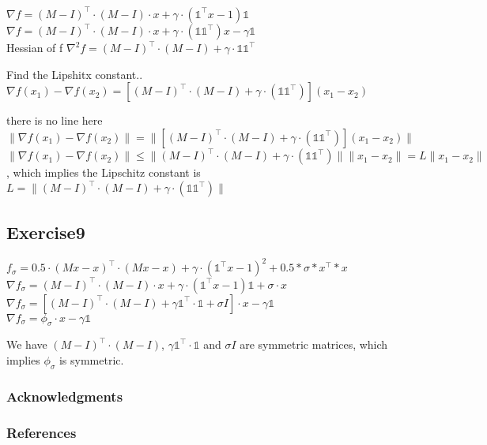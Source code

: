 \documentclass{article} %
\begin{document}
$\nabla f = (M-I)^\top\cdot(M-I)\cdot x + \gamma\cdot (\mathds{1}^\top x - 1)\mathds{1} $
\\


$\nabla f = (M-I)^\top\cdot(M-I)\cdot x + \gamma\cdot (\mathds{1} \mathds{1} ^\top)x -\gamma \mathds{1} $
\\
Hessian of f
$\nabla^2 f = (M-I)^\top\cdot(M-I) + \gamma\cdot \mathds{1}\mathds{1} ^\top$



Find the Lipshitx constant..
$\nabla f(x_1) - \nabla f(x_2) =  [ (M-I)^\top\cdot(M-I) + \gamma\cdot (\mathds{1} \mathds{1} ^\top)](x_1 - x_2)$

there is no line here\\
$\| \nabla f(x_1) - \nabla f(x_2) \|=  \| [ (M-I)^\top\cdot(M-I) + \gamma\cdot (\mathds{1} \mathds{1} ^\top)](x_1 - x_2)\|$
\\
$\| \nabla f(x_1) - \nabla f(x_2) \|\leq \| (M-I)^\top\cdot(M-I) + \gamma\cdot (\mathds{1} \mathds{1} ^\top)\| \|x_1 - x_2\| = L \|x_1 - x_2\|$, which 
implies the Lipschitz constant is\\
$L =  \| (M-I)^\top\cdot(M-I) + \gamma\cdot (\mathds{1} \mathds{1} ^\top) \|$



\subsection{Exercise9}
$f_{\sigma} = 0.5\cdot (Mx-x)^\top\cdot(Mx-x) + \gamma\cdot (\mathds{1}^\top x - 1)^2 + 0.5*\sigma* x^\top*x$ 
\\
$\nabla f_{\sigma} = (M-I)^\top\cdot(M-I)\cdot x + \gamma\cdot (\mathds{1}^\top x - 1)\mathds{1} + \sigma\cdot x$ 
\\
$\nabla f_{\sigma} = [(M-I)^\top\cdot(M-I) + \gamma \mathds{1}^\top\cdot \mathds{1} + \sigma I] \cdot x - \gamma\mathds{1}$
\\
$\nabla f_{\sigma} = \phi_{\sigma} \cdot x - \gamma\mathds{1}$


We have $(M-I)^\top\cdot(M-I) $, $\gamma \mathds{1}^\top\cdot \mathds{1}$ and $\sigma I$ are symmetric matrices, which implies
$\phi_{\sigma}$ is symmetric.
 

\subsubsection*{Acknowledgments}

\subsubsection*{References}
\end{document}
